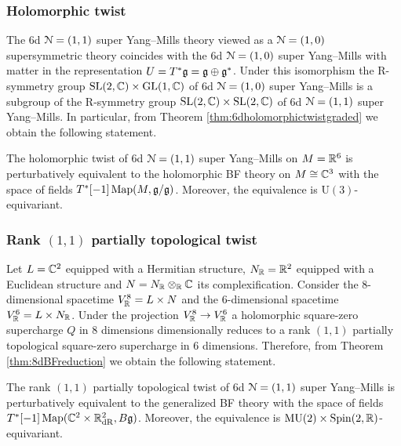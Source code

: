 \documentclass[10pt, oneside]{article}
\newcommand{\MU}{\mathrm{MU}}
\renewcommand{\U}{\mathrm{U}}
\begin{document}
\subsubsection{Holomorphic twist}
\label{sect:6d11holomorphictwist}

The 6d $\mathcal N=(1, 1)$ super Yang--Mills theory viewed as a $\mathcal N=(1, 0)$ supersymmetric theory coincides with the 6d $\mathcal N=(1, 0)$ super Yang--Mills with matter in the representation $U=T^*\mathfrak g=\mathfrak g\oplus \mathfrak g^*$. Under this isomorphism the R-symmetry group $\mathrm{SL}(2, \mathbb C)\times \mathrm{GL}(1, \mathbb C)$ of 6d $\mathcal N=(1, 0)$ super Yang--Mills is a subgroup of the R-symmetry group $\mathrm{SL}(2, \mathbb C)\times \mathrm{SL}(2, \mathbb C)$ of 6d $\mathcal N=(1, 1)$ super Yang--Mills. In particular, from Theorem \ref{thm:6dholomorphictwistgraded} we obtain the following statement.

\begin{theorem}
The holomorphic twist of 6d $\mathcal N=(1, 1)$ super Yang--Mills on $M=\mathbb R^6$ is perturbatively equivalent to the holomorphic BF theory on $M\cong \mathbb C^3$ with the space of fields $T^*[-1]\operatorname{Map}(M, \mathfrak g/\mathfrak g)$. Moreover, the equivalence is $\U(3)$-equivariant.
\label{thm:6d11holomorphictwist}
\end{theorem}

\subsubsection{Rank \texorpdfstring{$(1, 1)$}{(1,1)} partially topological twist}
\label{sect:6d11partialtwist}

Let $L=\mathbb C^2$ equipped with a Hermitian structure, $N_\mathbb R=\mathbb R^2$ equipped with a Euclidean structure and $N=N_\mathbb R\otimes_\mathbb R\mathbb C$ its complexification. Consider the 8-dimensional spacetime $V^8_\mathbb R=L\times N$ and the 6-dimensional spacetime $V^6_\mathbb R=L\times N_\mathbb R$. Under the projection $V^8_\mathbb R\rightarrow V^6_\mathbb R$ a holomorphic square-zero supercharge $Q$ in 8 dimensions dimensionally reduces to a rank $(1, 1)$ partially topological square-zero supercharge in 6 dimensions. Therefore, from Theorem \ref{thm:8dBFreduction} we obtain the following statement.

\begin{theorem}
The rank $(1, 1)$ partially topological twist of 6d $\mathcal N=(1, 1)$ super Yang--Mills is perturbatively equivalent to the generalized BF theory with the space of fields $T^*[-1]\operatorname{Map}(\mathbb C^2\times \mathbb R^2_{\mathrm{dR}}, B\mathfrak g)$. Moreover, the equivalence is $\MU(2)\times\Spin(2, \RR)$-equivariant.
\end{theorem}
\end{document}

